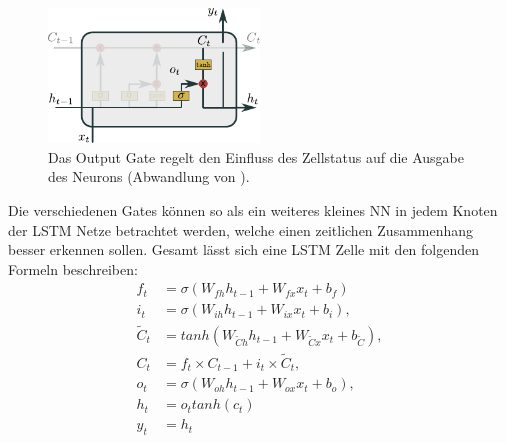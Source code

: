                 \begin{figure}[ht]
                    \centering
                    \includegraphics[width=0.5\textwidth]{images/Illustrationen/LSTM_OG}
                    \caption{Das Output Gate regelt den Einfluss des Zellstatus auf die Ausgabe des Neurons (Abwandlung von \cite{OLAH2015}).}
                    \label{fig:LSTM_Output}
                \end{figure}
            
            Die verschiedenen Gates können so als ein weiteres kleines NN in jedem Knoten der LSTM Netze betrachtet werden, welche einen zeitlichen Zusammenhang besser erkennen sollen.
            Gesamt lässt sich eine LSTM Zelle mit den folgenden Formeln beschreiben:
            \begin{equation}
                \begin{split}
                    f_t &= \sigma\left(W_{fh}h_{t-1} + W_{fx}x_t + b_f\right) \\
                    i_t &= \sigma\left(W_{ih}h_{t-1} + W_{ix}x_t + b_i\right), \\
                    \tilde{C}_t &= tanh\left(W_{\tilde{C}h}h_{t-1} + W_{\tilde{C}x}x_t + b_{\tilde{C}}\right),\\
                    C_t &=f_t\times C_{t-1} + i_t\times \tilde{C}_t, \\
                    o_t &= \sigma\left(W_{oh}h_{t-1} + W_{ox}x_t + b_o \right), \\
                    h_t &= o_ttanh\left(c_t\right) \\
                    y_t &= h_t
                \end{split}
            \end{equation}
